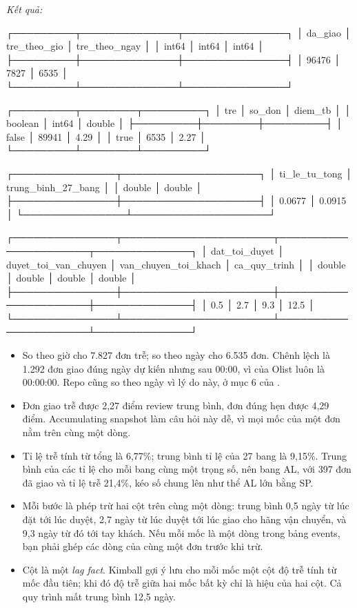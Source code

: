 \textit{Kết quả:}
\begin{codeblock}
┌─────────┬──────────────┬───────────────┐
│ da_giao │ tre_theo_gio │ tre_theo_ngay │
│  int64  │    int64     │     int64     │
├─────────┼──────────────┼───────────────┤
│   96476 │         7827 │          6535 │
└─────────┴──────────────┴───────────────┘

┌─────────┬────────┬─────────┐
│   tre   │ so_don │ diem_tb │
│ boolean │ int64  │ double  │
├─────────┼────────┼─────────┤
│ false   │  89941 │    4.29 │
│ true    │   6535 │    2.27 │
└─────────┴────────┴─────────┘

┌───────────────┬────────────────────┐
│ ti_le_tu_tong │ trung_binh_27_bang │
│    double     │       double       │
├───────────────┼────────────────────┤
│        0.0677 │             0.0915 │
└───────────────┴────────────────────┘

┌───────────────┬──────────────────────┬──────────────────────┬──────────────┐
│ dat_toi_duyet │ duyet_toi_van_chuyen │ van_chuyen_toi_khach │ ca_quy_trinh │
│    double     │        double        │        double        │    double    │
├───────────────┼──────────────────────┼──────────────────────┼──────────────┤
│           0.5 │                  2.7 │                  9.3 │         12.5 │
└───────────────┴──────────────────────┴──────────────────────┴──────────────┘
\end{codeblock}

\begin{itemize}
  \item So theo giờ cho 7.827 đơn trễ; so theo ngày cho 6.535 đơn. Chênh lệch là 1.292 đơn giao đúng ngày dự kiến nhưng sau 00:00, vì  của Olist luôn là 00:00:00. Repo  cũng so theo ngày vì lý do này, ở mục 6 của .
  \item Đơn giao trễ được 2,27 điểm review trung bình, đơn đúng hẹn được 4,29 điểm. Accumulating snapshot làm câu hỏi này dễ, vì mọi mốc của một đơn nằm trên cùng một dòng.
  \item Tỉ lệ trễ tính từ tổng là 6,77\%; trung bình tỉ lệ của 27 bang là 9,15\%. Trung bình của các tỉ lệ cho mỗi bang cùng một trọng số, nên bang AL, với 397 đơn đã giao và tỉ lệ trễ 21,4\%, kéo số chung lên như thể AL lớn bằng SP.
  \item Mỗi bước là phép trừ hai cột trên cùng một dòng: trung bình 0,5 ngày từ lúc đặt tới lúc duyệt, 2,7 ngày từ lúc duyệt tới lúc giao cho hãng vận chuyển, và 9,3 ngày từ đó tới tay khách. Nếu mỗi mốc là một dòng trong bảng events, bạn phải ghép các dòng của cùng một đơn trước khi trừ.
  \item Cột  là một \textit{lag fact}. Kimball gợi ý lưu cho mỗi mốc một cột độ trễ tính từ mốc đầu tiên; khi đó độ trễ giữa hai mốc bất kỳ chỉ là hiệu của hai cột. Cả quy trình mất trung bình 12,5 ngày.
\end{itemize}

